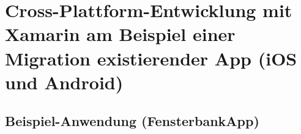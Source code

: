 \chapter{Cross-Plattform-Entwicklung mit Xamarin am Beispiel einer Migration existierender App
(iOS und Android)}
\section{Beispiel-Anwendung (FensterbankApp)}
